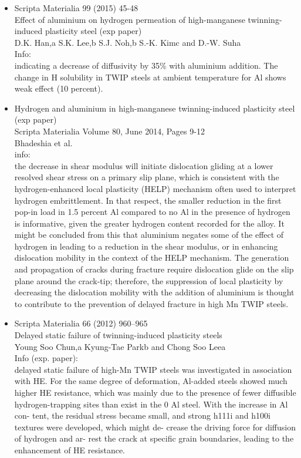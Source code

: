 \documentclass[11pt,floatfix,showpacs]{amsart}
\begin{document}
\begin{itemize}
\item Scripta Materialia 99 (2015) 45-48\\
        Effect of aluminium on hydrogen permeation of high-manganese twinning-induced plasticity steel (exp paper)\\
D.K. Han,a S.K. Lee,b S.J. Noh,b S.-K. Kimc and D.-W. Suha\\
Info:\\
indicating a decrease of diffusivity by 35\% with aluminium addition.
The change in H solubility  in TWIP steels at ambient temperature for Al shows weak effect (10 percent).


\item Hydrogen and aluminium in high-manganese twinning-induced plasticity steel (exp paper)\\
Scripta Materialia 
Volume 80, June 2014, Pages 9-12\\
Bhadeshia et al.\\
info:\\
the decrease in shear modulus will initiate dislocation gliding at a lower resolved shear stress on a primary slip plane, which is consistent with the hydrogen-enhanced local plasticity (HELP) mechanism often used to interpret hydrogen embrittlement. In that respect, the smaller reduction in the first pop-in load in 1.5 percent Al compared to no Al in the presence of hydrogen is informative, given the greater hydrogen content recorded for the alloy. It might be concluded from this that aluminium negates some of the effect of hydrogen in leading to a reduction in the shear modulus, or in enhancing dislocation mobility in the context of the HELP mechanism. The generation and propagation of cracks during fracture require dislocation glide on the slip plane around the crack-tip; therefore, the suppression of local plasticity by decreasing the dislocation mobility with the addition of aluminium is thought to contribute to the prevention of delayed fracture in high Mn TWIP steels.


\item Scripta Materialia 66 (2012) 960–965\\
Delayed static failure of twinning-induced plasticity steels\\
Young Soo Chun,a Kyung-Tae Parkb and Chong Soo Leea\\
Info (exp. paper):\\
delayed static failure of high-Mn TWIP steels was investigated in association with HE. For the same degree of deformation, Al-added steels showed much higher HE resistance, which was mainly due to the presence of fewer diffusible hydrogen-trapping sites than exist in the 0 Al steel. With the increase in Al con- tent, the residual stress became small, and strong h111i and h100i textures were developed, which might de- crease the driving force for diffusion of hydrogen and ar- rest the crack at specific grain boundaries, leading to the enhancement of HE resistance.


\end{itemize}
\end{document}

